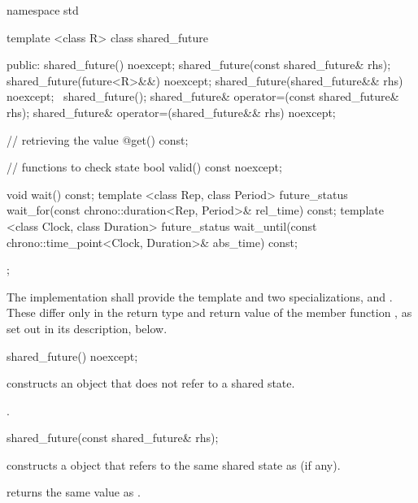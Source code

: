 \begin{codeblock}
namespace std {
  template <class R>
  class shared_future {
  public:
    shared_future() noexcept;
    shared_future(const shared_future& rhs);
    shared_future(future<R>&&) noexcept;
    shared_future(shared_future&& rhs) noexcept;
    ~shared_future();
    shared_future& operator=(const shared_future& rhs);
    shared_future& operator=(shared_future&& rhs) noexcept;

    // retrieving the value
    @\seebelow@ get() const;

    // functions to check state
    bool valid() const noexcept;

    void wait() const;
    template <class Rep, class Period>
      future_status wait_for(const chrono::duration<Rep, Period>& rel_time) const;
    template <class Clock, class Duration>
      future_status wait_until(const chrono::time_point<Clock, Duration>& abs_time) const;
  };
}
\end{codeblock}

\pnum
The implementation shall provide the template  and two
specializations,  and . These
differ only in the return type and return value of the member function , as
set out in its description, below.

%
\begin{itemdecl}
shared_future() noexcept;
\end{itemdecl}

\begin{itemdescr}
\pnum
\effects constructs an   object that does not refer to a
shared state.

\pnum
\postcondition {}.
\end{itemdescr}

%
\begin{itemdecl}
shared_future(const shared_future& rhs);
\end{itemdecl}

\begin{itemdescr}
\pnum
\effects constructs a  object that refers to the same
shared state as  (if any).

\pnum
\postcondition {} returns the same value as .
\end{itemdescr}

